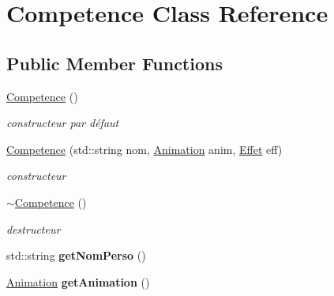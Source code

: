 \hypertarget{class_competence}{}\section{Competence Class Reference}
\label{class_competence}
\subsection*{Public Member Functions}
\begin{DoxyCompactItemize}
\item 
\mbox{\label{class_competence_a13eef314ce788330f875f7cf297dbb87}} 
\hyperlink{class_competence_a13eef314ce788330f875f7cf297dbb87}{Competence} ()
\begin{DoxyCompactList}\small\item\em constructeur par défaut \end{DoxyCompactList}\item 
\mbox{\label{class_competence_a03002906a1f1a13799026e69e1223d35}} 
\hyperlink{class_competence_a03002906a1f1a13799026e69e1223d35}{Competence} (std\+::string nom, \hyperlink{class_animation}{Animation} anim, \hyperlink{class_effet}{Effet} eff)
\begin{DoxyCompactList}\small\item\em constructeur \end{DoxyCompactList}\item 
\mbox{\label{class_competence_a69b58db16660b5cf76861a444385a205}} 
\hyperlink{class_competence_a69b58db16660b5cf76861a444385a205}{$\sim$\+Competence} ()
\begin{DoxyCompactList}\small\item\em destructeur \end{DoxyCompactList}\item 
\mbox{\label{class_competence_a511f022a58b30309ff991301d88a4c4c}} 
std\+::string {\bfseries get\+Nom\+Perso} ()
\item 
\mbox{\label{class_competence_aaca7ae6b2552bf62c83319826cf044a7}} 
\hyperlink{class_animation}{Animation} {\bfseries get\+Animation} ()
\item 
\mbox{\label{class_competence_afdadb0e1491ecd943ae283d174101a1a}} 

\end{DoxyCompactItemize}
